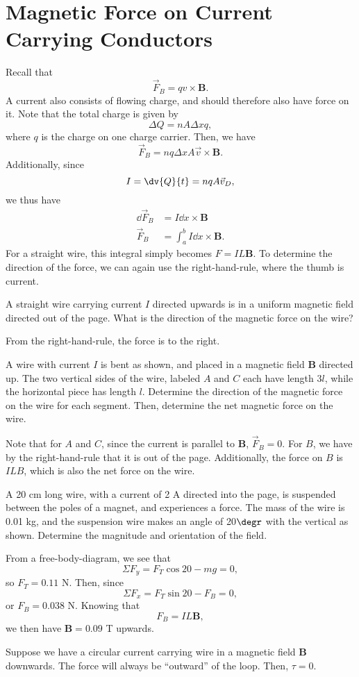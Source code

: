 \documentclass[11pt]{article}
\begin{document}
\section{Magnetic Force on Current Carrying Conductors}
Recall that
\[\vec{F}_B = qv\times \mathbf{B}.\]
A current also consists of flowing charge, and should therefore also have force on it. Note that the total charge is given by \[\Delta Q = nA\Delta x q,\]
where $q$ is the charge on one charge carrier. Then, we have
\[\vec{F}_B = nq\Delta x A \vec{v} \times \mathbf{B}.\]
Additionally, since
\[I = \dv{Q}{t} = nqA\vec{v}_D,\]
we thus have
\begin{align*}
    \dd \vec{F}_B &= I\dd x \times \mathbf{B} \\
    \vec{F}_B &= \int_a^b I\dd x \times \mathbf{B}.    
\end{align*}
For a straight wire, this integral simply becomes $F = IL\mathbf{B}$. To determine the direction of the force, we can again use the right-hand-rule, where the thumb is current.
\begin{example}
    A straight wire carrying current $I$ directed upwards is in a uniform magnetic field directed out of the page. What is the direction of the magnetic force on the wire?
\end{example}
\begin{solution}
    From the right-hand-rule, the force is to the right.
\end{solution}
\begin{example}
    A wire with current $I$ is bent as shown, and placed in a magnetic field $\mathbf{B}$ directed up. The two vertical sides of the wire, labeled $A$ and $C$ each have length $3l$, while the horizontal piece has length $l$. Determine the direction of the magnetic force on the wire for each segment. Then, determine the net magnetic force on the wire.
\end{example}
\begin{solution}
    Note that for $A$ and $C$, since the current is parallel to $\mathbf{B}$, $\vec{F}_B = 0$. For $B$, we have by the right-hand-rule that it is out of the page. Additionally, the force on $B$ is $ILB$, which is also the net force on the wire.
\end{solution}
\begin{example}
    A 20 cm long wire, with a current of 2 A directed into the page, is suspended between the poles of a magnet, and experiences a force. The mass of the wire is 0.01 kg, and the suspension wire makes an angle of 20$\degr$ with the vertical as shown. Determine the magnitude and orientation of the field.
\end{example}
\begin{solution}
    From a free-body-diagram, we see that \[\Sigma F_y = F_T\cos20 - mg = 0,\]
    so $F_T = 0.11$ N. Then, since \[\Sigma F_x = F_T\sin20 - F_B = 0,\] or $F_B = 0.038$ N. Knowing that \[F_B = IL\mathbf{B},\] we then have $\mathbf{B} = 0.09$ T upwards.
\end{solution}
Suppose we have a circular current carrying wire in a magnetic field $\mathbf{B}$ downwards. The force will always be ``outward'' of the loop. Then, $\tau = 0$.
\end{document}
